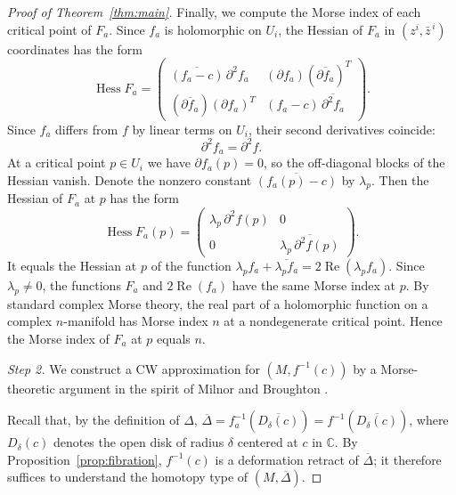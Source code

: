 \documentclass[11pt]{amsart}
\theoremstyle{plain}
\theoremstyle{definition}
\theoremstyle{remark}
\numberwithin{equation}{section}
\begin{document}
\begin{proof}[Proof of Theorem~\ref{thm:main}]
    Finally, we compute the Morse index of each critical point of $F_a$.
    Since $f_a$ is holomorphic on $U_i$, the Hessian of $F_a$ in $(z^i, \bar{z}^{\,i})$ coordinates has the form
    \begin{equation}
        \operatorname{Hess} F_a =
        \begin{pmatrix}
            \overline{(f_a - c)}\,\partial^2 f_a & (\partial f_a)(\overline{\partial f_a})^T \\
            (\overline{\partial f_a})(\partial f_a)^T & (f_a - c)\,\overline{\partial^2 f_a}
        \end{pmatrix}.
    \end{equation}
    Since $f_a$ differs from $f$ by linear terms on $U_i$, their second derivatives coincide:
    \begin{equation}
        \partial^2 f_a = \partial^2 f.
    \end{equation}
    At a critical point $p \in U_i$ we have $\partial f_a(p) = 0$, so the off-diagonal blocks of the Hessian vanish.
    Denote the nonzero constant $\overline{(f_a(p)-c)}$ by $\lambda_p$.
    Then the Hessian of $F_a$ at $p$ has the form
    \begin{equation}
        \operatorname{Hess} F_a(p) =
        \begin{pmatrix}
            \lambda_p\,\partial^2 f(p) & 0 \\
            0 & \overline{\lambda_p\,\partial^2 f(p)}
        \end{pmatrix}.
    \end{equation}
    It equals the Hessian at $p$ of the function $\lambda_p f_a + \overline{\lambda_p f_a} = 2\operatorname{Re}(\lambda_p f_a)$.
    Since $\lambda_p \neq 0$, the functions $F_a$ and $2\operatorname{Re}(f_a)$ have the same Morse index at $p$.
    By standard complex Morse theory, the real part of a holomorphic function on a complex $n$-manifold has Morse index $n$ at a nondegenerate critical point.
    Hence the Morse index of $F_a$ at $p$ equals $n$.

    \medskip
    \noindent\emph{Step 2.} We construct a CW approximation for $(M, f^{-1}(c))$ by a Morse-theoretic argument in the spirit of Milnor \cite{milnor1963morse} and Broughton \cite{Broughton1988}.

    Recall that, by the definition of $\Delta$, $\overline{\Delta} = f_a^{-1}(\overline{D_\delta(c)}) = f^{-1}(\overline{D_\delta(c)})$, where $D_\delta(c)$ denotes the open disk of radius $\delta$ centered at $c$ in $\mathbb{C}$.
    By Proposition~\ref{prop:fibration}, $f^{-1}(c)$ is a deformation retract of $\overline{\Delta}$; it therefore suffices to understand the homotopy type of $(M, \overline{\Delta})$.


\end{proof}
\end{document}
